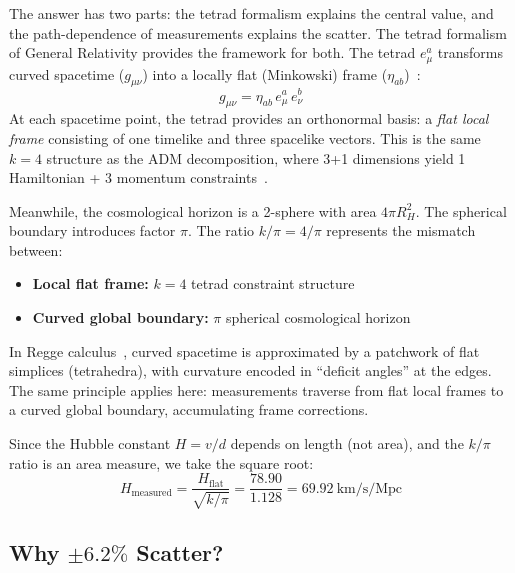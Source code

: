 \documentclass[aps,prd,preprint,superscriptaddress,showpacs,preprintnumbers,amsmath,amssymb,nofootinbib]{revtex4-2}
\begin{document}
The answer has two parts: the tetrad formalism explains the central value, and the path-dependence of measurements explains the scatter. The tetrad formalism of General Relativity provides the framework for both. The tetrad $e^a_\mu$ transforms curved spacetime ($g_{\mu\nu}$) into a locally flat (Minkowski) frame ($\eta_{ab}$)~\cite{mtw1973}:
\begin{equation}
g_{\mu\nu} = \eta_{ab}\, e^a_\mu\, e^b_\nu
\end{equation}
At each spacetime point, the tetrad provides an orthonormal basis: a \emph{flat local frame} consisting of one timelike and three spacelike vectors. This is the same $k=4$ structure as the ADM decomposition, where 3+1 dimensions yield 1 Hamiltonian + 3 momentum constraints~\cite{mtw1973}.

Meanwhile, the cosmological horizon is a 2-sphere with area $4\pi R_H^2$. The spherical boundary introduces factor $\pi$. The ratio $k/\pi = 4/\pi$ represents the mismatch between:
\begin{itemize}
\item \textbf{Local flat frame:} $k=4$ tetrad constraint structure
\item \textbf{Curved global boundary:} $\pi$ spherical cosmological horizon
\end{itemize}

In Regge calculus~\cite{regge1961}, curved spacetime is approximated by a patchwork of flat simplices (tetrahedra), with curvature encoded in ``deficit angles'' at the edges. The same principle applies here: measurements traverse from flat local frames to a curved global boundary, accumulating frame corrections.

Since the Hubble constant $H = v/d$ depends on length (not area), and the $k/\pi$ ratio is an area measure, we take the square root:
\begin{equation}
H_{\text{measured}} = \frac{H_{\text{flat}}}{\sqrt{k/\pi}} = \frac{78.90}{1.128} = 69.92~\text{km/s/Mpc}
\end{equation}

\subsection{Why \texorpdfstring{$\pm 6.2\%$}{±6.2\%} Scatter?}
\label{subsec:scatter}
\end{document}
